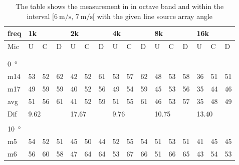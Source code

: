 \begin{table}[H]
\centering
\caption{The table shows the measurement in in octave band and within the interval $[\SI{6}{\meter\per\second},\, \SI{7}{\meter\per\second}[ $ with the given line source array angle}
\begin{tabular}{l|l|l|l|l|l|l|l|l|l|l|l|l|lll}
freq & \multicolumn{3}{l|}{1k} & \multicolumn{3}{l|}{2k} & \multicolumn{3}{l|}{4k} & \multicolumn{3}{l|}{8k} & \multicolumn{3}{l}{16k}                                \\ \hline
Mic  & U      & C      & D     & U      & C      & D     & U      & C      & D     & U      & C      & D     & \multicolumn{1}{l|}{U}  & \multicolumn{1}{l|}{C}  & D  \\ \hline
 & \multicolumn{3}{l|}{} & \multicolumn{3}{l|}{} & \multicolumn{3}{l|}{} & \multicolumn{3}{l|}{} & \multicolumn{3}{l}{}                                \\ 
 \multicolumn{16}{l}{ } \\   
\SI{0}{\degree}   & \multicolumn{3}{l|}{} & \multicolumn{3}{l|}{} & \multicolumn{3}{l|}{} & \multicolumn{3}{l|}{} & \multicolumn{3}{l}{}   \\  \hline
m14  & 53     & 52     & 62    & 42     & 52     & 61    & 53     & 57     & 62    & 48     & 53     & 58    & \multicolumn{1}{l|}{36} & \multicolumn{1}{l|}{51} & 51 \\
m17  & 49     & 59     & 59    & 40     & 52     & 56    & 49     & 54     & 59    & 45     & 53     & 56    & \multicolumn{1}{l|}{35} & \multicolumn{1}{l|}{44} & 46 \\ \hline
avg  &   51    &   56   & 61    &  41    &  52    &  59  &   51     &  55   &   61  &  46    & 53    &  57     & \multicolumn{1}{l|}{35}   & \multicolumn{1}{l|}{48}   & 49 \\ \hline  
Dif & \multicolumn{3}{l|}{9.62} & \multicolumn{3}{l|}{17.67} & \multicolumn{3}{l|}{9.76} & \multicolumn{3}{l|}{10.75} & \multicolumn{3}{l}{13.40}  \\ 
 \multicolumn{16}{l}{ } \\                             
\SI{10}{\degree}   & \multicolumn{3}{l|}{} & \multicolumn{3}{l|}{} & \multicolumn{3}{l|}{} & \multicolumn{3}{l|}{} & \multicolumn{3}{l}{}   \\  \hline
m5    & 54     & 52     & 51     &  45    & 50     &  44    &  52    & 55      &  54    &    51   &  53    &  51    & \multicolumn{1}{l|}{41} & \multicolumn{1}{l|}{45} & 45 \\ 
m6    & 56     &  60    &  58    &  47    &  64    &  64    & 53     &  67     &   66   &    51   &    66  &   65   & \multicolumn{1}{l|}{43} & \multicolumn{1}{l|}{54} &53  \\ 

\end{tabular}
\end{table}
